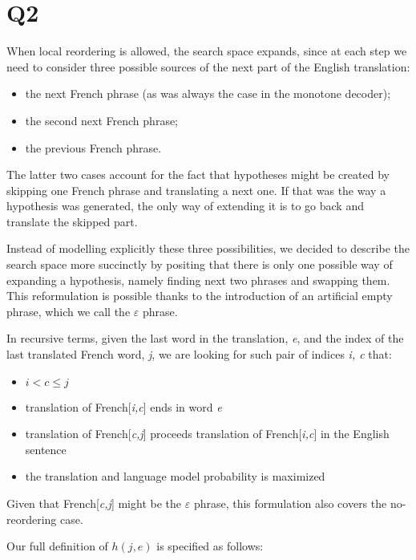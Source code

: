 \section*{Q2}
When local reordering is allowed, the search space expands, since at each step we need to consider three possible sources of the next part of the English translation:
\begin{itemize}
	\item the next French phrase (as was always the case in the monotone decoder);
	\item the second next French phrase;
	\item the previous French phrase.
\end{itemize}
The latter two cases account for the fact that hypotheses might be created by skipping one French phrase and translating a next one. If that was the way a hypothesis was generated, the only way of extending it is to go back and translate the skipped part.

Instead of modelling explicitly these three possibilities, we decided to describe the search space more succinctly by positing that there is only one possible way of expanding a hypothesis, namely finding next two phrases and swapping them. This reformulation is possible thanks to the introduction of an artificial empty phrase, which we call the $\varepsilon$ phrase.

In recursive terms, given the last word in the translation, \textit{e}, and the index of the last translated French word, \textit{j}, we are looking for such pair of indices \textit{i, c} that:
\begin{itemize}
	\item $i < c \leq j$
	\item translation of French[\textit{i,c}] ends in word \textit{e}
	\item translation of French[\textit{c,j}] proceeds translation of French[\textit{i,c}] in the English sentence
	\item the translation and language model probability is maximized
\end{itemize}
Given that French[\textit{c,j}] might be the $\varepsilon$ phrase, this formulation also covers the no-reordering case.
\vspace{4mm} %

Our full definition of $h(j,e)$ is specified as follows:
\vspace{4mm} %



